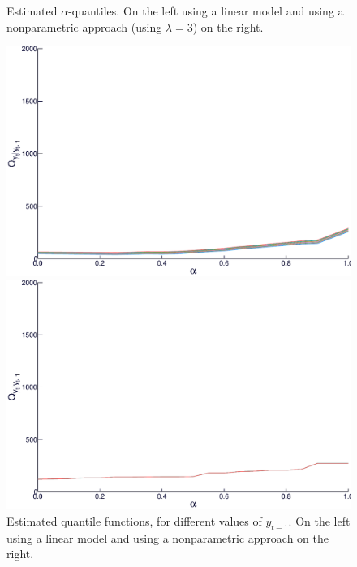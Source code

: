 \begin{figure}
\begin{minipage}[t]{\linewidth}
\begin{minipage}[t]{0.45\linewidth}
    \end{minipage}
  \end{minipage}
  \caption{Estimated $\alpha$-quantiles. On the left using a linear model and using a nonparametric approach (using $\lambda = 3$) on the right.}
  \label{fig:scatterplot-alphaquantiles}
\end{figure}




\begin{figure}
  \centering
  \begin{minipage}[t]{\linewidth}
    \centering
    \begin{minipage}[t]{0.45\linewidth}
      \centering     \includegraphics[width=\textwidth]{Figuras/regressao-quantilica/quantile-linear}
    \end{minipage}
    \begin{minipage}[t]{0.45\linewidth}
      \centering     \includegraphics[width=\textwidth]{Figuras/regressao-quantilica/quantile-nonpar}
    \end{minipage}
  \end{minipage}
  \caption{Estimated quantile functions, for different values of $y_{t-1}$. On the left using a linear model and using a nonparametric approach on the right.}
  \label{fig:quantiles-vs-xt}
\end{figure}

